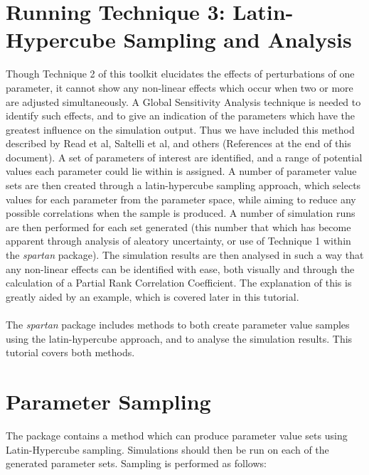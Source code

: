 \documentclass[a4paper,11pt]{article}
\begin{document}
\section{Running Technique 3: Latin-Hypercube Sampling and Analysis}
\noindent Though Technique 2 of this toolkit elucidates the effects of perturbations of one parameter, it cannot show any non-linear effects which occur when two or more are adjusted simultaneously. A Global Sensitivity Analysis technique is needed to identify such effects, and to give an indication of the parameters which have the greatest influence on the simulation output. Thus we have included this method described by Read et al, Saltelli et al, and others (References at the end of this document). A set of parameters of interest are identified, and a range of potential values each parameter could lie within is assigned. A number of parameter value sets are then created through a latin-hypercube sampling approach, which selects values for each parameter from the parameter space, while aiming to reduce any possible correlations when the sample is produced.  A number of simulation runs are then performed for each set generated (this number that which has become apparent through analysis of aleatory uncertainty, or use of Technique 1 within the \textit{spartan} package). The simulation results are then analysed in such a way that any non-linear effects can be identified with ease, both visually and through the calculation of a Partial Rank Correlation Coefficient.  The explanation of this is greatly aided by an example, which is covered later in this tutorial. \\
\\
The \textit{spartan} package includes methods to both create parameter value samples using the latin-hypercube approach, and to analyse the simulation results. This tutorial covers both methods.\\

\section{Parameter Sampling}
\noindent The package contains a method which can produce parameter value sets using Latin-Hypercube sampling. Simulations should then be run on each of the generated parameter sets.  Sampling is performed as follows:\\
\end{document}
